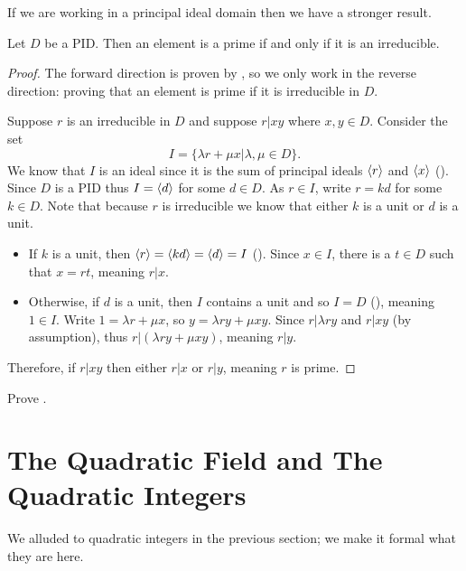 If we are working in a principal ideal domain then we have a stronger result.
\begin{theorem}\label{thrm-in-PID-prime-iff-irreducible}
    Let $D$ be a PID. Then an element is a prime if and only if it is an irreducible.
\end{theorem}
\begin{proof}
    The forward direction is proven by , so we only work in the reverse direction: proving that an element is prime if it is irreducible in $D$.

    Suppose $r$ is an irreducible in $D$ and suppose $r \vert xy$ where $x, y \in D$. Consider the set
    \[
        I = \{\lambda r + \mu x \vert \lambda, \mu \in D\}.
    \]
    We know that $I$ is an ideal since it is the sum of principal ideals $\left\langle r\right\rangle$ and $\left\langle x\right\rangle$ (). Since $D$ is a PID thus $I = \left\langle d\right\rangle$ for some $d \in D$. As $r \in I$, write $r = kd$ for some $k \in D$. Note that because $r$ is irreducible we know that either $k$ is a unit or $d$ is a unit.
    \begin{itemize}
        \item If $k$ is a unit, then $\left\langle r\right\rangle = \left\langle kd\right\rangle = \left\langle d\right\rangle = I$ (). Since $x \in I$, there is a $t \in D$ such that $x = rt$, meaning $r \vert x$.
        \item Otherwise, if $d$ is a unit, then $I$ contains a unit and so $I = D$ (), meaning $1 \in I$. Write $1 = \lambda r + \mu x$, so $y = \lambda ry + \mu xy$. Since $r \vert \lambda ry$ and $r \vert xy$ (by assumption), thus $r \vert (\lambda ry + \mu xy)$, meaning $r \vert y$.
    \end{itemize}
    Therefore, if $r \vert xy$ then either $r \vert x$ or $r \vert y$, meaning $r$ is prime.
\end{proof}
\begin{exercise}\label{exercise-associates-of-irreducible-is-irreducible}
    Prove .
\end{exercise}

\section{The Quadratic Field and The Quadratic Integers}
We alluded to quadratic integers in the previous section; we make it formal what they are here.

